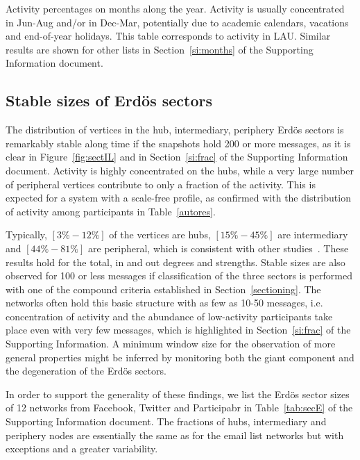 \documentclass[%
aip,
jmp,%
amsmath,amssymb,
reprint,%
]{revtex4-1}
\begin{document}
\begin{table}
\caption{Activity percentages on months along the year. 	Activity is usually concentrated in Jun-Aug and/or in Dec-Mar, potentially due to academic calendars, vacations and end-of-year holidays. This table corresponds to activity in LAU. Similar results are shown for other lists in Section~\ref{si:months} of the Supporting Information document.}
\footnotesize

\label{tab:min2}
\end{table}


\subsection{Stable sizes of Erd\"os sectors}\label{subsec:pih}

The distribution of vertices in the hub, intermediary, periphery Erd\"os sectors is remarkably stable along time if the snapshots hold 200 or more messages, as it is clear in Figure~\ref{fig:sectIL} and in Section~\ref{si:frac} of the Supporting Information document. 
Activity is highly concentrated on the hubs, while a very large number of peripheral vertices contribute to only a fraction of the activity.
This is expected for a system with a scale-free profile, as confirmed with the distribution of activity among participants in Table~\ref{autores}.

Typically, $[3\%-12\%]$ of the vertices are hubs,
$[15\%-45\%]$ are intermediary and $[44\%-81\%]$ are peripheral,
which is consistent with other studies~\cite{secFree}.
These results hold for the total, in and out degrees and strengths.
Stable sizes are also observed for 100 or less messages if classification 
of the three sectors is performed with one of the compound criteria established in Section~\ref{sectioning}. The networks often hold this basic structure with as few as 10-50 messages, i.e. concentration of activity and the abundance of low-activity participants take place even with very few messages, which is highlighted in Section~\ref{si:frac} of the Supporting Information. A minimum window size for the observation of more general properties might be inferred by monitoring 
both the giant component and the degeneration of the Erd\"os sectors.

In order to support the generality of these findings,
we list the Erd\"os sector sizes of 12 networks from Facebook, Twitter and Participabr in Table~\ref{tab:secE} of the Supporting Information document. The fractions of hubs, intermediary and periphery nodes are
essentially the same as for the email list networks but with exceptions and a greater variability.
\end{document}
